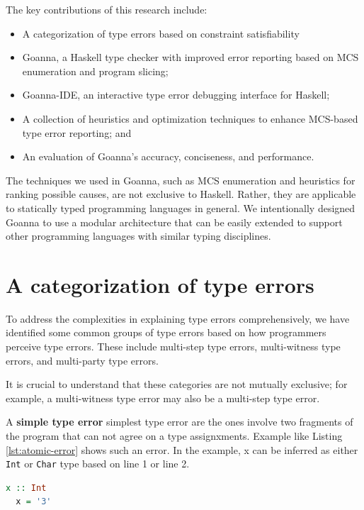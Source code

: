 \documentclass[pdflatex,sn-mathphys-num]{sn-jnl}%
\begin{document}
    The key contributions of this research include:
    \begin{itemize}
        \item A categorization of type errors based on constraint satisfiability
        \item Goanna, a Haskell type checker with improved error reporting based on MCS enumeration and program slicing;
        \item Goanna-IDE, an interactive type error debugging interface for Haskell; 
        \item A collection of heuristics and optimization techniques to enhance MCS-based type error reporting; and
        \item An evaluation of Goanna's accuracy, conciseness, and performance.
    \end{itemize}

  The techniques we used in Goanna, such as MCS enumeration and heuristics for ranking possible causes, are not exclusive to Haskell. Rather, they are applicable to statically typed programming languages in general. We intentionally designed Goanna to use a modular architecture that can be easily extended to support other programming languages with similar typing disciplines.

\section*{A categorization of type errors} \label{sec:category}

To address the complexities in explaining type errors comprehensively, we have identified some common groups of type errors based on how programmers perceive type errors. These include multi-step type errors, multi-witness type errors, and multi-party type errors.


It is crucial to understand that these categories are not mutually exclusive; for example, a multi-witness type error may also be a multi-step type error.

A \textbf{simple type error} simplest type error are the ones involve two fragments of the program that can not agree on a type assignxments. Example like Listing \ref{lst:atomic-error} shows such an error. In the example, x can be inferred as either \texttt{Int} or \texttt{Char} type based on line 1 or line 2. 

\begin{lstlisting}[language=Haskell, caption=The simplest form of type error, label={lst:atomic-error}]
  x :: Int
  x = '3'
\end{lstlisting}
\end{document}
